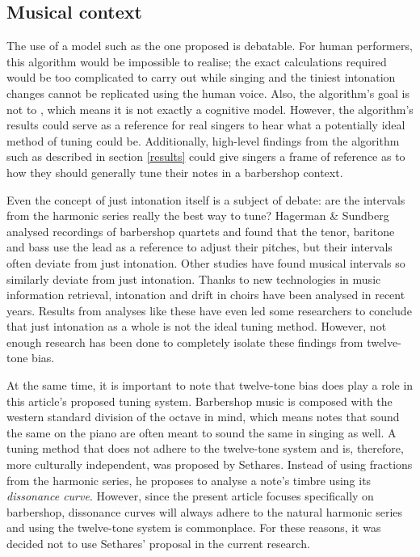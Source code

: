 \documentclass[a4paper]{article}
\begin{document}
\subsection{Musical context}
The use of a model such as the one proposed is debatable. For human performers, this algorithm would be impossible to realise; the exact calculations required would be too complicated to carry out while singing and the tiniest intonation changes cannot be replicated using the human voice. Also, the algorithm's goal is not to , which means it is not exactly a cognitive model. \cite{van_maanen_interpretation_2021} However, the algorithm's results could serve as a reference for real singers to hear what a potentially ideal method of tuning could be. Additionally, high-level findings from the algorithm such as described in section \ref{results} could give singers a frame of reference as to how they should generally tune their notes in a barbershop context.

Even the concept of just intonation itself is a subject of debate: are the intervals from the harmonic series really the best way to tune? Hagerman \& Sundberg \cite{hagerman_fundamental_1980} analysed recordings of barbershop quartets and found that the tenor, baritone and bass use the lead as a reference to adjust their pitches, but their intervals often deviate from just intonation. \cite{abbott_acoustic_2001} Other studies have found musical intervals so similarly deviate from just intonation. \cite{nordmark_intonation_1996, sundberg_rules_2009} Thanks to new technologies in music information retrieval, intonation and drift in choirs have been analysed in recent years. \cite{devaney_study_2012, mauch_intonation_2014, dai_intonation_2019} Results from analyses like these have even led some researchers to conclude that just intonation as a whole is not the ideal tuning method. \cite{parncutt_psychocultural_2018, kopiez_intonation_2003} However, not enough research has been done to completely isolate these findings from twelve-tone bias. \cite{burns_7_1999}

At the same time, it is important to note that twelve-tone bias does play a role in this article's proposed tuning system. Barbershop music is composed with the western standard division of the octave in mind, which means notes that sound the same on the piano are often meant to sound the same in singing as well. A tuning method that does not adhere to the twelve-tone system and is, therefore, more culturally independent, was proposed by Sethares. \cite{sethares_adaptive_1994} Instead of using fractions from the harmonic series, he proposes to analyse a note's timbre using its \textit{dissonance curve}. However, since the present article focuses specifically on barbershop, dissonance curves will always adhere to the natural harmonic series and using the twelve-tone system is commonplace. For these reasons, it was decided not to use Sethares' proposal in the current research.
\end{document}
